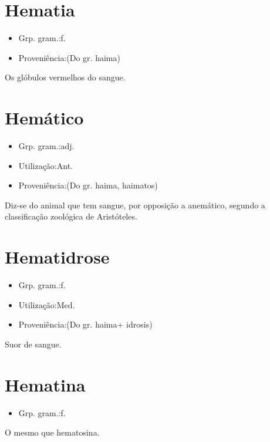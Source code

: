 \documentclass{article}
\begin{document}
\section{Hematia}
\begin{itemize}
\item {Grp. gram.:f.}
\end{itemize}
\begin{itemize}
\item {Proveniência:(Do gr. \textunderscore haima\textunderscore )}
\end{itemize}
Os glóbulos vermelhos do sangue.
\section{Hemático}
\begin{itemize}
\item {Grp. gram.:adj.}
\end{itemize}
\begin{itemize}
\item {Utilização:Ant.}
\end{itemize}
\begin{itemize}
\item {Proveniência:(Do gr. \textunderscore haima\textunderscore , \textunderscore haimatos\textunderscore )}
\end{itemize}
Diz-se do animal que tem sangue, por opposição a \textunderscore anemático\textunderscore , segundo a classificação zoológica de Aristóteles.
\section{Hematidrose}
\begin{itemize}
\item {Grp. gram.:f.}
\end{itemize}
\begin{itemize}
\item {Utilização:Med.}
\end{itemize}
\begin{itemize}
\item {Proveniência:(Do gr. \textunderscore haima\textunderscore  + \textunderscore idrosis\textunderscore )}
\end{itemize}
Suor de sangue.
\section{Hematina}
\begin{itemize}
\item {Grp. gram.:f.}
\end{itemize}
O mesmo que \textunderscore hematosina\textunderscore .
\end{document}
